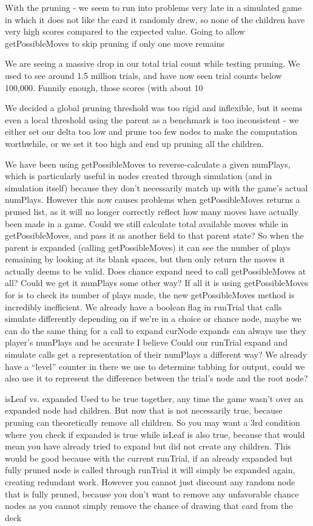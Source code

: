 \documentclass[letterpaper]{article}
\begin{document}
With the pruning - we seem to run into problems very late in a simulated game in which it does not like the card it randomly drew, so none of the children have very high scores compared to the expected value.
	Going to allow getPossibleMoves to skip pruning if only one move remains

We are seeing a massive drop in our total trial count while testing pruning. We used to see around 1.5 million trials, and have now seen trial counts below 100,000. Funnily enough, those scores (with about 10%

We decided a global pruning threshold was too rigid and inflexible, but it seems even a local threshold using the parent as a benchmark is too inconsistent - we either set our delta too low and prune too few nodes to make the computation worthwhile, or we set it too high and end up pruning all the children. 


We have been using getPossibleMoves to reverse-calculate a given numPlays, which is particularly useful in nodes created through simulation (and in simulation itself) because they don’t necessarily match up with the game’s actual numPlays. However this now causes problems when getPossibleMoves returns a pruned list, as it will no longer correctly reflect how many moves have actually been made in a game.
	Could we still calculate total available moves while in getPossibleMoves, and pass it as another field to that parent state? So when the parent is expanded (calling getPossibleMoves) it can see the number of plays remaining by looking at its blank spaces, but then only return the moves it actually deems to be valid.
	Does chance expand need to call getPossibleMoves at all? Could we get it numPlays some other way? If all it is using getPossibleMoves for is to check its number of plays made, the new getPossibleMoves method is incredibly inefficient. We already have a boolean flag in runTrial that calls simulate differently depending on if we’re in a choice or chance node, maybe we can do the same thing for a call to expand
	curNode expands can always use they player’s numPlays and be accurate I believe
	Could our runTrial expand and simulate calls get a representation of their numPlays a different way? We already have a “level” counter in there we use to determine tabbing for output, could we also use it to represent the difference between the trial’s node and the root node?


isLeaf vs. expanded
	Used to be true together, any time the game wasn’t over an expanded node had children. But now that is not necessarily true, because pruning can theoretically remove all children. So you may want a 3rd condition where you check if expanded is true while isLeaf is also true, because that would mean you have already tried to expand but did not create any children. This would be good because with the current runTrial, if an already expanded but fully pruned node is called through runTrial it will simply be expanded again, creating redundant work. However you cannot just discount any random node that is fully pruned, because you don’t want to remove any unfavorable chance nodes as you cannot simply remove the chance of drawing that card from the deck
\end{document}
